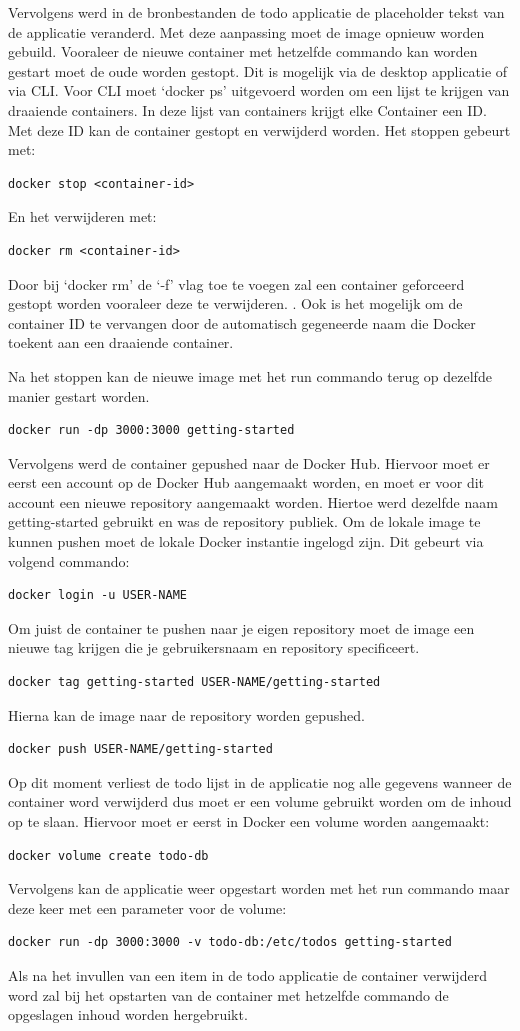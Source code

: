 Vervolgens werd in de bronbestanden de todo applicatie de placeholder tekst van de applicatie veranderd. Met deze aanpassing moet de image opnieuw worden gebuild. Vooraleer de nieuwe container met hetzelfde commando kan worden gestart moet de oude worden gestopt. Dit is mogelijk via de desktop applicatie of via CLI. Voor CLI moet ‘docker ps’ uitgevoerd worden om een lijst te krijgen van draaiende containers. In deze lijst van containers krijgt elke Container een ID. Met deze ID kan de container gestopt en verwijderd worden.
Het stoppen gebeurt met:
\begin{verbatim}
docker stop <container-id>
\end{verbatim}
En het verwijderen met:
\begin{verbatim}
docker rm <container-id>
\end{verbatim}
Door bij ‘docker rm’ de ‘-f’ vlag toe te voegen zal een container geforceerd gestopt worden vooraleer deze te verwijderen. . Ook is het mogelijk om de container ID te vervangen door de automatisch gegeneerde naam die Docker toekent aan een draaiende container.

Na het stoppen kan de nieuwe image met het run commando terug op dezelfde manier gestart worden.
\begin{verbatim}
docker run -dp 3000:3000 getting-started
\end{verbatim}
Vervolgens werd de container gepushed naar de Docker Hub. Hiervoor moet er eerst een account op de Docker Hub aangemaakt worden, en moet er voor dit account een nieuwe repository aangemaakt worden. Hiertoe werd dezelfde naam getting-started gebruikt en was de repository publiek. Om de lokale image te kunnen pushen moet de lokale Docker instantie ingelogd zijn. Dit gebeurt via volgend commando:
\begin{verbatim}
docker login -u USER-NAME
\end{verbatim}
Om juist de container te pushen naar je eigen repository moet de image een nieuwe tag krijgen die je gebruikersnaam en repository specificeert.
\begin{verbatim}
docker tag getting-started USER-NAME/getting-started
\end{verbatim}
Hierna kan de image naar de repository worden gepushed.
\begin{verbatim}
docker push USER-NAME/getting-started
\end{verbatim}
Op dit moment verliest de todo lijst in de applicatie nog alle gegevens wanneer de container word verwijderd dus moet er een volume gebruikt worden om de inhoud op te slaan. Hiervoor moet er eerst in Docker een volume worden aangemaakt:
\begin{verbatim}
docker volume create todo-db
\end{verbatim}
Vervolgens kan de applicatie weer opgestart worden met het run commando maar deze keer met een parameter voor de volume:
\begin{verbatim}
docker run -dp 3000:3000 -v todo-db:/etc/todos getting-started
\end{verbatim}
Als na het invullen van een item in de todo applicatie de container verwijderd word zal bij het opstarten van de container met hetzelfde commando de opgeslagen inhoud worden hergebruikt.

